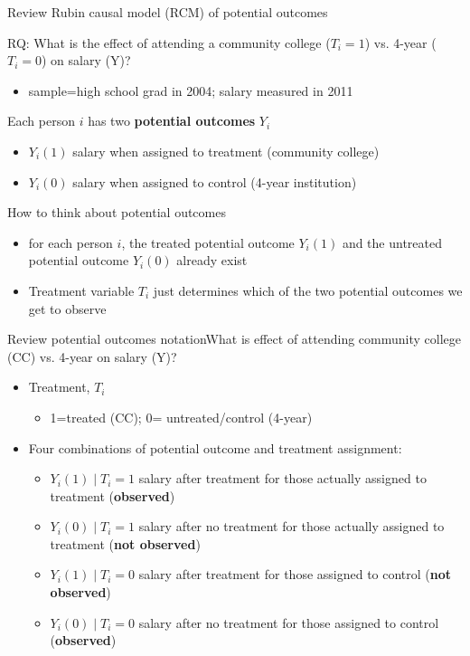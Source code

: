 \begin{frame}{Review Rubin causal model (RCM) of potential outcomes}

	RQ: What is the effect of attending a community college ($T_i=1$) vs. 4-year ($T_i=0$) on salary (Y)?
	\begin{itemize}
		\item sample=high school grad in 2004; salary measured in 2011
	\end{itemize}
	\vspace{2mm}
	Each person $i$ has two \textbf{potential outcomes} \(Y_i\)
	\begin{itemize}
		\item \(Y_i(1)\) salary when assigned to treatment (community college)	
		\item \(Y_i(0)\) salary when assigned to control (4-year institution)
	\end{itemize}
	\vspace{2mm}
	How to think about potential outcomes
	\begin{itemize}
		\item for each person $ i$, the treated potential outcome $ Y_i(1) $ and the untreated potential outcome $ Y_i(0) $ already exist
		\item Treatment variable $ T_i $ just determines which of the two potential outcomes we get to observe	
	\end{itemize}	
\end{frame}

\begin{frame}{Review potential outcomes notation}{What is effect of attending community college (CC) vs. 4-year on salary (Y)?}

	\begin{itemize}
		\item Treatment, $T_i$
		\begin{itemize}
			\item 1=treated (CC); 0= untreated/control (4-year)
		\end{itemize}
		\vspace{2mm}		
		\item Four combinations of potential outcome and treatment assignment:
		\begin{itemize}
			\item \(Y_i(1) \mid T_i=1\)  salary after treatment for those actually assigned to treatment (\textbf{observed})
			\item \(Y_i(0) \mid T_i=1\)  salary after no treatment for those actually assigned to treatment (\textbf{not observed})
			\item \(Y_i(1) \mid T_i=0 \)  salary after treatment for those assigned to control (\textbf{not observed})			
			\item \(Y_i(0) \mid T_i=0 \)  salary after no treatment for those assigned to control (\textbf{observed})

		\end{itemize}
	\end{itemize}	
\end{frame}

